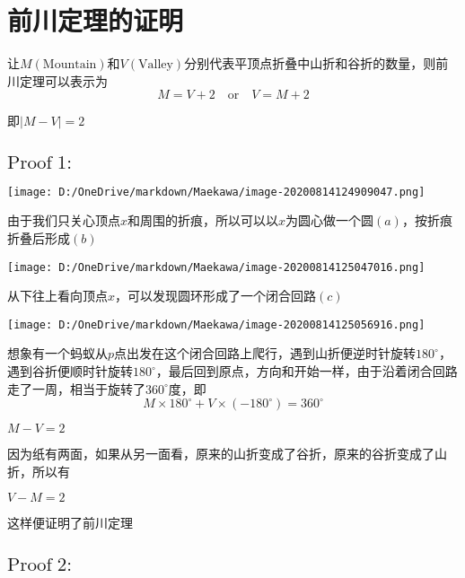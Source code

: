 \documentclass[a4paper,12pt]{article}
\begin{document}
\section{前川定理的证明\cite{demaine2007geometric}}
让$M(\text{Mountain})$和$V(\text{Valley})$分别代表平顶点折叠中山折和谷折的数量，则前川定理可以表示为
\begin{equation}\label{2}
    M = V +2 \quad \text{or}\quad V = M + 2
\end{equation}
    


即$|M-V|=2$

\subsection{$\text{Proof}\;1:$}
\begin{center}
\texttt{[image: D:/OneDrive/markdown/Maekawa/image-20200814124909047.png]}
\end{center}

由于我们只关心顶点$x$和周围的折痕，所以可以以$x$为圆心做一个圆$(a)$，按折痕折叠后形成$(b)$\\

\begin{center}
\texttt{[image: D:/OneDrive/markdown/Maekawa/image-20200814125047016.png]}\\
\end{center}

从下往上看向顶点$x$，可以发现圆环形成了一个闭合回路$(c)$

\begin{center}
    \texttt{[image: D:/OneDrive/markdown/Maekawa/image-20200814125056916.png]}
\end{center}


想象有一个蚂蚁从$p$点出发在这个闭合回路上爬行，遇到山折便逆时针旋转$180^{\circ}$，遇到谷折便顺时针旋转$180^{\circ}$，最后回到原点，方向和开始一样，由于沿着闭合回路走了一周，相当于旋转了$360^{\circ}$度，即
\begin{equation}\label{1}
    M \times 180^{\circ} +V \times (-180^{\circ}) = 360^{\circ}
\end{equation}


$M - V = 2$

因为纸有两面，如果从另一面看，原来的山折变成了谷折，原来的谷折变成了山折，所以有

$V - M = 2$

这样便证明了前川定理

\subsection{$\text{Proof}\;2:$}
\end{document}
